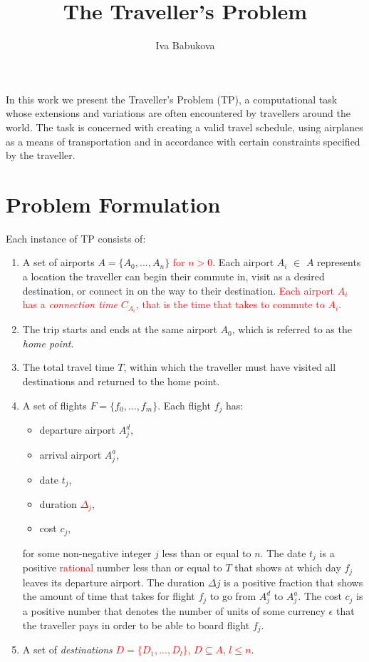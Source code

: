 \documentclass{article}
\title{The Traveller's Problem}
\author{Iva Babukova}
\theoremstyle{definition}
\begin{document}
\maketitle

In this work we present the Traveller's Problem (TP), a computational task whose extensions and variations are often encountered by travellers around the world. The task is concerned with creating a valid travel schedule, using airplanes as a means of transportation and in accordance with certain constraints specified by the traveller.

\section{Problem Formulation}
Each instance of TP consists of:


\begin{enumerate}
\item A set of airports $A = \{ A_{0},...,A_{n} \}$ \textcolor{red}{for $n > 0$}. Each airport $A_{i}$ $\in$ $A$ represents a location the traveller can begin their commute in, visit as a desired destination, or connect in on the way to their destination.
\textcolor{red}{Each airport $A_{i}$ has a \textit{connection time} $C_{A_{i}}$, that is the time that takes to commute to $A_{i}$.}
\item The trip starts and ends at the same airport $A_{0}$, which is referred to as the \textit{home point}.

\item The total travel time $T$, within which the traveller must have visited all destinations and returned to the home point.
 
\item A set of flights $F = \{ f_{0},...,f_{m} \}$. Each flight $f_{j}$ has:
\begin{itemize}
\item departure airport $A^{d}_{j}$,
\item arrival airport $A^{a}_{j}$,
\item date $t_{j}$,
\item duration \textcolor{red}{$\Delta_{j}$},
\item cost $c_{j}$,
\end{itemize} 
for some non-negative integer $j$ less than or equal to $n$.
The date $t_{j}$ is a positive \textcolor{red}{rational} number less than or equal to $T$ that shows at which day $f_{j}$ leaves its departure airport. The duration $\Delta{j}$ is a positive fraction that shows the amount of time that takes for flight $f_{j}$ to go from $A^{d}_{j}$ to $A^{a}_{j}$. The cost $c_{j}$ is a positive number that denotes the number of units of some currency $\epsilon$ that the traveller pays in order to be able to board flight $f_{j}$.

\item A set of \textit{destinations} \textcolor{red}{$D = \{ D_{1},...,D_{l} \}$, $D \subseteq A$, $l \leq n$}.
\end{enumerate}
\end{document}
